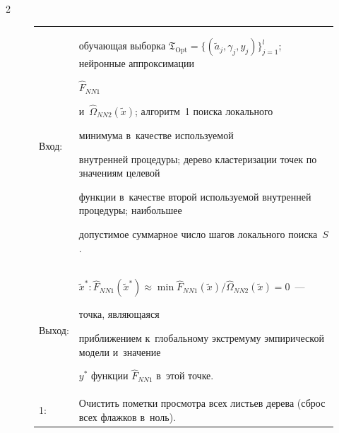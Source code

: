 \begin{multicols}{2}
\setcounter{figure}{2}





\begin{figure}[b] %


\vspace*{-9pt}




 \vspace*{4pt}


 


{\small 


\begin{center}


\begin{tabular}{l p{146.7mm}}


\hline


Вход: & обучающая выборка $\mathfrak{T}_{\mathrm{Opt}}=\{ 


(\tilde{a}_j,\gamma_j,y_j)\}_{j=1}^l$; нейронные аппроксимации 


$\hat{F}_{NN1}$


и~$\hat{\Omega}_{NN2}(\tilde{x})$; алгоритм~1 поиска локального 


минимума в~качестве  используемой


внут\-рен\-ней процедуры; дерево кластеризации точек по значениям целевой


функции в~качестве второй используемой внутренней процедуры; наибольшее


допустимое суммарное число шагов локального поиска~$S$.\\


Выход: &


$\tilde{x}^{*}: \hat{F}_{NN1}(\tilde{x}^{*})\approx 


\min \hat{F}_{NN1}(\tilde{x})  / \hat{\Omega}_{NN2}(\tilde{x}) = 0$~--- 


точка, являющаяся


приближением к~глобальному экстремуму эмпирической  модели и~значение


$y^{*}$ функции $\hat{F}_{NN1}$ в~этой точке.\\


\hline


1:& Очистить пометки просмотра всех листьев дерева (сброс всех флажков в~ноль).\\



\end{tabular}
\end{center}}
\end{figure}
\end{multicols}
